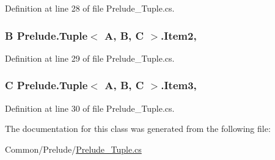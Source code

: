 Definition at line 28 of file Prelude\+\_\+\+Tuple.\+cs.

\hypertarget{class_prelude_1_1_tuple_3_01_a_00_01_b_00_01_c_01_4_a8f1818519e4e1f6926f65910ef986be9}{
\subsubsection[{Item2}]{\setlength{\rightskip}{0pt plus 5cm}B Prelude.\+Tuple$<$ A, B, C $>$.Item2\hspace{0.3cm}{\ttfamily [get]}, {\ttfamily [set]}}}\label{class_prelude_1_1_tuple_3_01_a_00_01_b_00_01_c_01_4_a8f1818519e4e1f6926f65910ef986be9}


Definition at line 29 of file Prelude\+\_\+\+Tuple.\+cs.

\hypertarget{class_prelude_1_1_tuple_3_01_a_00_01_b_00_01_c_01_4_a5fc282d403a3721429e4a11dfcb9855b}{
\subsubsection[{Item3}]{\setlength{\rightskip}{0pt plus 5cm}C Prelude.\+Tuple$<$ A, B, C $>$.Item3\hspace{0.3cm}{\ttfamily [get]}, {\ttfamily [set]}}}\label{class_prelude_1_1_tuple_3_01_a_00_01_b_00_01_c_01_4_a5fc282d403a3721429e4a11dfcb9855b}


Definition at line 30 of file Prelude\+\_\+\+Tuple.\+cs.



The documentation for this class was generated from the following file\+:\begin{DoxyCompactItemize}
\item 
Common/\+Prelude/\hyperlink{_prelude___tuple_8cs}{Prelude\+\_\+\+Tuple.\+cs}\end{DoxyCompactItemize}
